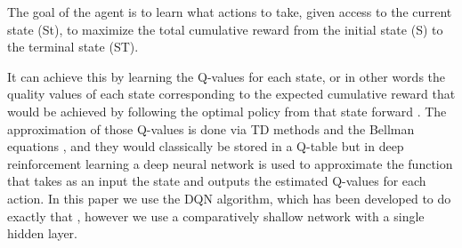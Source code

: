 The goal of the agent is to learn what actions to take, given access to the current state (St), to maximize the total cumulative reward from the initial state (S) to the terminal state (ST).

It can achieve this by learning the Q-values for each state, or in other words the quality values of each state corresponding to the expected cumulative reward that would be achieved by following the optimal policy from that state forward \citep{sutton_barto_2018}. The approximation of those Q-values is done via TD methods and the Bellman equations \citep{sutton_barto_2018}, and they would classically be stored in a Q-table but in deep reinforcement learning a deep neural network is used to approximate the function that takes as an input the state and outputs the estimated Q-values for each action. In this paper we use the DQN algorithm, which has been developed to do exactly that \citep{mnih2015human}, however we use a comparatively shallow network with a single hidden layer.
